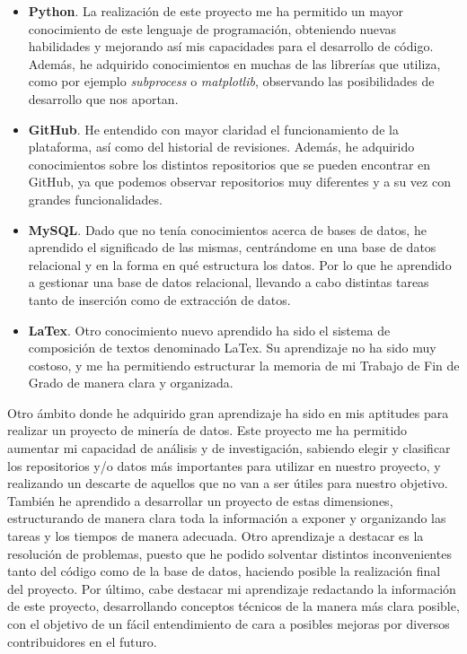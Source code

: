 \documentclass[a4paper, 12pt]{book}
\begin{document}
\begin{itemize}
  \item \textbf{Python}. La realización de este proyecto me ha permitido un mayor conocimiento de este lenguaje de programación, obteniendo nuevas habilidades
  y mejorando así mis capacidades para el desarrollo de código. Además, he adquirido conocimientos en muchas de las librerías que utiliza, como por ejemplo \textit{subprocess} o
  \textit{matplotlib}, observando las posibilidades de desarrollo que nos aportan.
  \item \textbf{GitHub}. He entendido con mayor claridad el funcionamiento de la plataforma, así como del historial de revisiones. Además, he adquirido conocimientos
  sobre los distintos repositorios que se pueden encontrar en GitHub, ya que podemos observar repositorios muy diferentes y a su vez con grandes funcionalidades.
  \item \textbf{MySQL}. Dado que no tenía conocimientos acerca de bases de datos, he aprendido el significado de las mismas, centrándome en una base de datos relacional y
  en la forma en qué estructura los datos. Por lo que he aprendido a gestionar una base de datos relacional, llevando a cabo distintas tareas tanto de inserción como de
  extracción de datos.
  \item \textbf{LaTex}. Otro conocimiento nuevo aprendido ha sido el sistema de composición de textos denominado LaTex. Su aprendizaje no ha sido muy costoso, y me ha permitiendo
  estructurar la memoria de mi Trabajo de Fin de Grado de manera clara y organizada.
\end{itemize}

Otro ámbito donde he adquirido gran aprendizaje ha sido en mis aptitudes para realizar un proyecto de minería de datos. Este proyecto me ha permitido aumentar mi capacidad de análisis y de investigación,
sabiendo elegir y clasificar los repositorios y/o datos más importantes para utilizar en nuestro proyecto, y realizando un descarte de aquellos que no van a ser útiles para nuestro objetivo.
También he aprendido a desarrollar un proyecto de estas dimensiones, estructurando de manera clara toda la información a exponer y organizando las tareas y los tiempos de manera adecuada.
Otro aprendizaje a destacar es la resolución de problemas, puesto que he podido solventar distintos inconvenientes tanto del código como de la base de datos, haciendo posible la realización
final del proyecto.
Por último, cabe destacar mi aprendizaje redactando la información de este proyecto, desarrollando conceptos técnicos de la manera más clara posible, con el objetivo de un fácil entendimiento
de cara a posibles mejoras por diversos contribuidores en el futuro.
\end{document}
